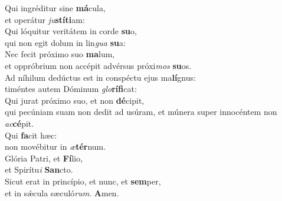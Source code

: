 \evenverse Qui ingréditur sine \textbf{má}cula,~\*\\
\evenverse et operátur \textit{ju}\textbf{stí}\textbf{ti}am:\\
\oddverse Qui lóquitur veritátem in corde \textbf{su}o,~\*\\
\oddverse qui non egit dolum in lin\textit{gua} \textbf{su}a:\\
\evenverse Nec fecit próximo suo \textbf{ma}lum,~\*\\
\evenverse et oppróbrium non accépit advérsus próxi\textit{mos} \textbf{su}os.\\
\oddverse Ad níhilum dedúctus est in conspéctu ejus ma\textbf{lí}gnus:~\*\\
\oddverse timéntes autem Dóminum \textit{glo}\textbf{rí}\textbf{fi}cat:\\
\evenverse Qui jurat próximo suo, et non \textbf{dé}cipit,~\*\\
\evenverse qui pecúniam suam non dedit ad usúram, et múnera super innocéntem non \textit{ac}\textbf{cé}pit.\\
\oddverse Qui \textbf{fa}cit hæc:~\*\\
\oddverse non movébitur in \textit{æ}\textbf{tér}num.\\
\evenverse Glória Patri, et \textbf{Fí}lio,~\*\\
\evenverse et Spirítu\textit{i} \textbf{San}cto.\\
\oddverse Sicut erat in princípio, et nunc, et \textbf{sem}per,~\*\\
\oddverse et in sǽcula sæculó\textit{rum}. \textbf{A}men.\\
